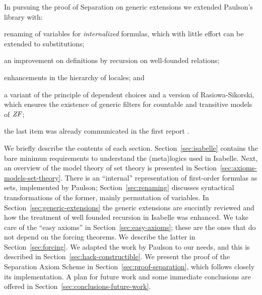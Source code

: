 
In pursuing the proof of Separation on generic extensions we
extended Paulson's library with:
\begin{inlinelist}
\item renaming of variables for \emph{internalized} formulas, which
  with little effort can be extended 
  to substitutions;
\item an improvement on definitions by recursion on well-founded
  relations; 
\item enhancements in the hierarchy of locales; and
\item a variant of the  principle of dependent choices and a version
  of Rasiowa-Sikorski, which 
  ensures the existence of generic filters for countable and transitive
  models of $\mathit{ZF}$;
\end{inlinelist} 
the last item was already communicated in the
  first report \cite{2018arXiv180705174G}.
  
We briefly describe the contents of each
section. Section~\ref{sec:isabelle} contains the bare minimun
requirements to understand the (meta)logics used in Isabelle. Next, an
overview of the model theory of set theory is presented in
Section~\ref{sec:axioms-models-set-theory}. There is an ``internal''
representation of first-order formulas as sets, implemented by
Paulson; Section~\ref{sec:renaming} discusses syntactical
transformations of the former, mainly permutation of variables. 
In Section~\ref{sec:generic-extensions} the generic extensions are
succintly reviewed and how the treatment of well founded recursion in
Isabelle was enhanced. We take care of the ``easy axioms'' in
Section~\ref{sec:easy-axioms}; these are the ones that
do not depend on the forcing theorems. We describe the latter in
Section~\ref{sec:forcing}. We adapted the  work by Paulson to our
needs, and this is described in
Section~\ref{sec:hack-constructible}. We present the proof
of the Separation Axiom Scheme in Section~\ref{sec:proof-separation},
which follows closely its implementation. A plan for future work and
some immediate conclusions are offered in
Section~\ref{sec:conclusions-future-work}.

